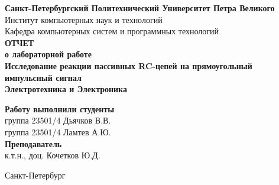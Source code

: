 \begin{titlepage}	%

	\begin{center}		%

		 \textbf{Санкт-Петербургский Политехнический Университет Петра Великого}\\[0.3cm]
		 \small Институт компьютерных наук и технологий \\[0.3cm]
		 \small Кафедра компьютерных систем и программных технологий\\[4cm]
		
		 \textbf{ОТЧЕТ}\\ \textbf{о лабораторной работе}\\[0.5cm]
		 \textbf{Исследование реакции пассивных RC-цепей на прямоугольный импульсный сигнал}\\[0.1cm]
		 \textbf{Электротехника и Электроника}\\[10cm]

	\end{center}


	\begin{flushright} %
		\begin{minipage}{0.60\textwidth} %
			\begin{flushleft} %

				 \small \textbf{Работу выполнили студенты}\\[3mm]
				 \small группа 23501/4\hspace*{17mm}   Дьячков В.В.\\[3mm]
				 \small группа 23501/4\hspace*{17mm}   Ламтев А.Ю.\\[5mm]
				
				\small \textbf{Преподаватель}\\[5mm]
			 	\small \sign[3.5cm]   \hspace*{8mm} к.т.н., доц. Кочетков Ю.Д.\\[0.5cm]

			\end{flushleft}
		\end{minipage}
	\end{flushright}
	
	\vfill %

	\begin{center}
	\small Санкт-Петербург\\
	\small \the\year %
	\end{center} %

\thispagestyle{empty} %
\end{titlepage} %

\vfill %
